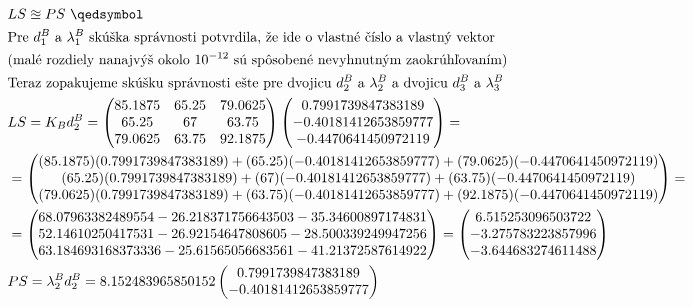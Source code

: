 \documentclass[a4paper]{article}
\begin{document}
\begin{align*}
		&LS \approxeq PS \text{  }\qedsymbol
		\\
		&\text{Pre $d_1^B$ a $\lambda_1^B$ skúška správnosti potvrdila, že ide o vlastné číslo a vlastný vektor} 
		\\
		&\text{(malé rozdiely nanajvýš okolo $10^{-12}$ sú spôsobené nevyhnutným zaokrúhľovaním)}
		\\
		&\text{Teraz zopakujeme skúšku správnosti ešte pre dvojicu $d_2^B$ a $\lambda_2^B$ a dvojicu $d_3^B$ a $\lambda_3^B$} 
		\\
		&LS=K_B d_2^B= \begin{pmatrix}
			85.1875 & 65.25 & 79.0625 \\
			65.25 & 67 & 63.75 \\
			79.0625 & 63.75 & 92.1875
		\end{pmatrix}
		\begin{pmatrix}
			0.7991739847383189  \\
			-0.40181412653859777 \\
			-0.4470641450972119
		\end{pmatrix}=
		\\
		&=\begin{pmatrix}
			(85.1875)(0.7991739847383189) + (65.25)(-0.40181412653859777) + (79.0625)(-0.4470641450972119) \\
			(65.25)(0.7991739847383189) + (67)(-0.40181412653859777) + (63.75)(-0.4470641450972119) \\
			(79.0625)(0.7991739847383189) + (63.75)(-0.40181412653859777) + (92.1875)(-0.4470641450972119)
		\end{pmatrix}=
		\\
		&=\begin{pmatrix}
			68.07963382489554 -26.218371756643503 -35.34600897174831 \\
			52.14610250417531 -26.92154647808605 -28.500339249947256 \\
			63.184693168373336 -25.61565056683561 -41.21372587614922
		\end{pmatrix}=
		\begin{pmatrix}
			6.515253096503722 \\
			-3.275783223857996 \\
			-3.644683274611488
		\end{pmatrix}
		\\
		&PS=\lambda_2^B d_2^B= 8.152483965850152 \begin{pmatrix}
			0.7991739847383189  \\
			-0.40181412653859777 \\

\end{pmatrix}
\end{align*}
\end{document}

